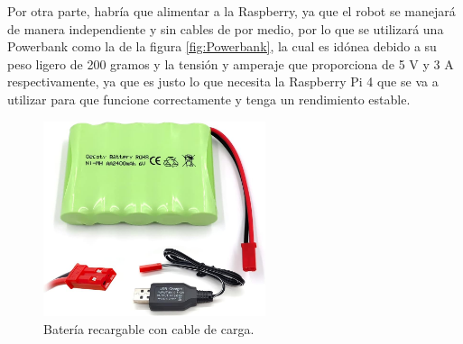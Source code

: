 Por otra parte, habría que alimentar a la Raspberry, ya que el robot se manejará de manera independiente y sin cables de por medio, por lo que se utilizará una Powerbank como la de la figura \ref{fig:Powerbank}, la cual es idónea debido a su peso ligero de 200 gramos y la tensión y amperaje que proporciona de 5 V y 3 A respectivamente, ya que es justo lo que necesita la Raspberry Pi 4 que se va a utilizar para que funcione correctamente y tenga un rendimiento estable.

\begin{figure}[H]
  \begin{minipage}{0.48\textwidth}
    \centering
    \includegraphics[width=6.5cm]{figs/bateria.jpg}
    \caption{Batería recargable con cable de carga.}
    \label{fig:bateria}
  \end{minipage}
  \hfill
  \begin{minipage}{0.48\textwidth}
    \centering

\end{minipage}
\end{figure}
